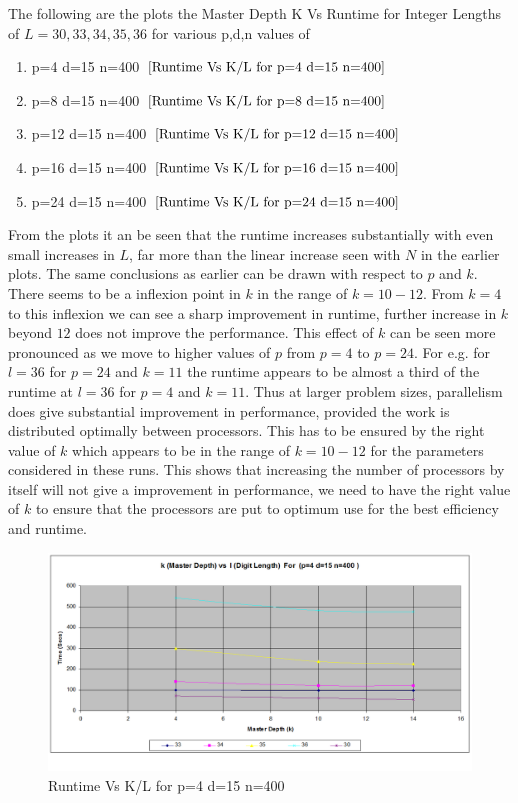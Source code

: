 \documentclass[twoside,11pt]{article}\usepackage{amsmath,amsfonts,amsthm,fullpage}
\begin{document}
The following are the plots the Master Depth K Vs Runtime for Integer Lengths of $L={30,33,34,35,36}$ for various p,d,n values of 
\begin{enumerate}
\item
p=4 d=15 n=400 $\eqref{Runtime Vs K/L for p=4 d=15 n=400}$
\item
p=8 d=15 n=400 $\eqref{Runtime Vs K/L for p=8 d=15 n=400}$
\item
p=12 d=15 n=400 $\eqref{Runtime Vs K/L for p=12 d=15 n=400}$
\item
p=16 d=15 n=400 $\eqref{Runtime Vs K/L for p=16 d=15 n=400}$
\item
p=24 d=15 n=400 $\eqref{Runtime Vs K/L for p=24 d=15 n=400}$
\end{enumerate}
From the plots it an be seen that the runtime increases substantially with even small increases in $L$, far more than the linear increase seen with $N$ in the earlier plots. The same conclusions as earlier can be drawn with respect to $p$ and $k$. There seems to be a inflexion point in $k$ in the range of $k=10-12$. From $k=4$ to this inflexion we can see a sharp improvement in runtime, further increase in $k$ beyond $12$ does not improve the performance. This effect of $k$ can be seen more pronounced as we move to higher values of $p$ from $p=4$ to $p=24$. For e.g. for $l=36$ for $p=24$ and $k=11$ the runtime appears to be almost a third of the runtime at $l=36$ for $p=4$ and $k=11$. Thus at larger problem sizes, parallelism does give substantial improvement in performance, provided the work is distributed optimally between processors. This has to be ensured by the right value of $k$ which appears to be in the range of $k=10-12$ for the parameters considered in these runs. This shows that increasing the number of processors by itself will not give a improvement in performance, we need to have the right value of $k$ to ensure that the processors are put to optimum use for the best efficiency and runtime.

\begin{figure}[!htbp]
\centering
\includegraphics[scale=.46]{images/pdn_p=4-d=15-n=400} 
\caption{Runtime Vs K/L for p=4 d=15 n=400}
\label{Runtime Vs K/L for p=4 d=15 n=400}
\end{figure}
\end{document}
